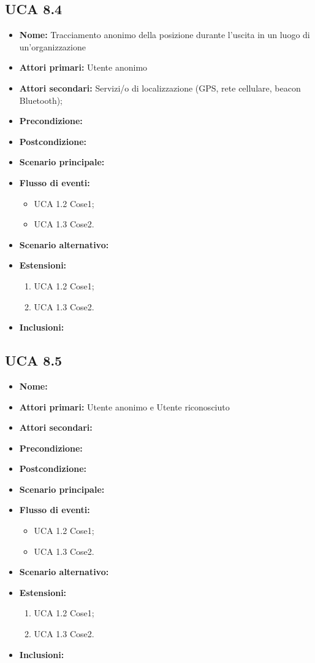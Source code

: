 \subsection{UCA 8.4}%
\begin{itemize}
	\item \textbf{Nome:} Tracciamento anonimo della posizione durante l'uscita in un luogo di un'organizzazione
	\item \textbf{Attori primari:} Utente anonimo 
	\item \textbf{Attori secondari:} Servizi/o di localizzazione (GPS, rete cellulare, beacon Bluetooth);
	\item \textbf{Precondizione:}
	\item \textbf{Postcondizione:}
	\item \textbf{Scenario principale:}
	\item \textbf{Flusso di eventi:} 
	\begin{itemize}
		\item UCA 1.2 Cose1;
		\item UCA 1.3 Cose2.
	\end{itemize}
	\item \textbf{Scenario alternativo:}
	\item \textbf{Estensioni:}
	\begin{enumerate}
		\item UCA 1.2 Cose1;
		\item UCA 1.3 Cose2.
	\end{enumerate}
	\item \textbf{Inclusioni:}
\end{itemize}

\subsection{UCA 8.5}%
\begin{itemize}
	\item \textbf{Nome:}
	\item \textbf{Attori primari:} Utente anonimo e Utente riconosciuto
	\item \textbf{Attori secondari:}
	\item \textbf{Precondizione:}
	\item \textbf{Postcondizione:}
	\item \textbf{Scenario principale:}
	\item \textbf{Flusso di eventi:} 
	\begin{itemize}
		\item UCA 1.2 Cose1;
		\item UCA 1.3 Cose2.
	\end{itemize}
	\item \textbf{Scenario alternativo:}
	\item \textbf{Estensioni:}
	\begin{enumerate}
		\item UCA 1.2 Cose1;
		\item UCA 1.3 Cose2.
	\end{enumerate}
	\item \textbf{Inclusioni:}
\end{itemize}

